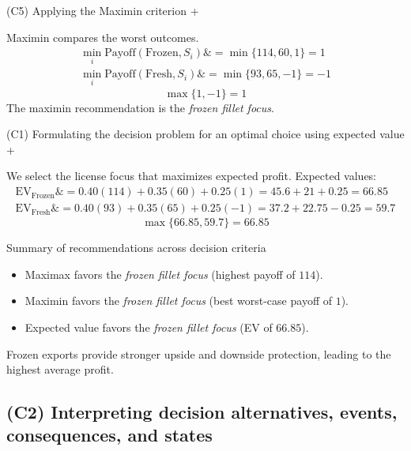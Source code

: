 \documentclass[11pt]{article}
\begin{document}
	
	
	
	
	(C5) Applying the Maximin criterion
	+
	
	
	Maximin compares the worst outcomes.
	\[
	\begin{aligned}
		\min_i \text{Payoff}(\text{Frozen}, S_i) \&= \min\{114, 60, 1\} = 1 \\
		\min_i \text{Payoff}(\text{Fresh}, S_i) \&= \min\{93, 65, -1\} = -1
	\end{aligned}
	\]
	\[
	\max\{1, -1\} = 1
	\]
	The maximin recommendation is the \emph{frozen fillet focus}.
	
	
	
	
	
	(C1) Formulating the decision problem for an optimal choice using expected value
	+
	
	
	We select the license focus that maximizes expected profit. Expected values:
	\[
	\begin{aligned}
		\mathrm{EV}_{\text{Frozen}} \&= 0.40(114) + 0.35(60) + 0.25(1) = 45.6 + 21 + 0.25 = 66.85 \\
		\mathrm{EV}_{\text{Fresh}} \&= 0.40(93) + 0.35(65) + 0.25(-1) = 37.2 + 22.75 - 0.25 = 59.7
	\end{aligned}
	\]
	\[
	\max\{66.85, 59.7\} = 66.85
	\]
	
	Summary of recommendations across decision criteria
	\begin{itemize}
		\item Maximax favors the \emph{frozen fillet focus} (highest payoff of $114$).
		\item Maximin favors the \emph{frozen fillet focus} (best worst-case payoff of $1$).
		\item Expected value favors the \emph{frozen fillet focus} (EV of $66.85$).
	\end{itemize}
	
	
	Frozen exports provide stronger upside and downside protection, leading to the highest average profit.
	
	\subsection*{(C2) Interpreting decision alternatives, events, consequences, and states}
	
	\hypertarget{problem11-c2}{}
	
\end{document}
